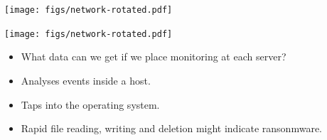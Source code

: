 \begin{frame}
  \centering
  \texttt{[image: figs/network-rotated.pdf]}

\end{frame}

\begin{frame}
  \centering
  \texttt{[image: figs/network-rotated.pdf]}
  \begin{question}
    \begin{itemize}
      \item What data can we get if we place monitoring at each server?
    \end{itemize}
  \end{question}
\end{frame}

\begin{frame}
  \begin{definition}
    \begin{itemize}
      \item Analyses events inside a host.
      \item Taps into the operating system.
    \end{itemize}
  \end{definition}

  \pause

  \begin{example}
    \begin{itemize}
      \item Rapid file reading, writing and deletion might indicate 
        ransonmware.
    \end{itemize}
  \end{example}
\end{frame}

